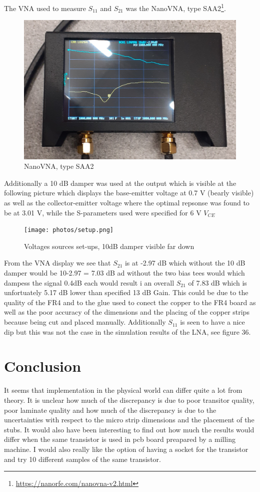 \documentclass{article}
\begin{document}
The VNA used to measure $S_{11}$ and  $S_{21}$ was the NanoVNA, type SAA2\footnote{\url{https://nanorfe.com/nanovna-v2.html}}.
\begin{figure}[H]
\centering
  \includegraphics[scale=0.1]{photos/VNA.png}
  \caption{NanoVNA, type SAA2}
  \label{fig4}
\end{figure}
Additionally a 10 dB damper was used at the output which is visible at the following picture
which displays the base-emitter voltage at 0.7 V (bearly visible) as well as the collector-emitter
voltage where the optimal repsonse was found to be at 3.01 V, while the S-parameters used
were specified for 6 V $V_{CE}$
\begin{figure}[H]
\centering
  \texttt{[image: photos/setup.png]}
  \caption{Voltages sources set-ups, 10dB damper visible far down}
  \label{fig4}
\end{figure}
From the VNA display we see that $S_{21}$ is at -2.97 dB which without the 10 dB damper would be
10-2.97 = 7.03 dB ad without the two bias tees would which dampess the signal 0.4dB each
would result i an overall $S_{21}$ of 7.83 dB which is unfortuately 5.17 dB lower than specified 13 dB Gain.
This could be due to the quality of the FR4 and to the glue used to conect the copper to the
FR4 board as well as the poor accuracy of the dimensions and the placing of the copper strips because being cut
and placed manually. Additionally $S_{11}$ is seen to have a nice dip but this was not the case
in the simulation results of the LNA, see figure 36. 

\section{Conclusion}
 It seems that implementation in the physical world
 can differ quite a lot from theory. It is unclear how much of the discrepancy is due to
poor transitor quality, poor laminate quality and how much of the discrepancy is due to the uncertainties with respect to the micro strip 
dimensions and the placement of the stubs. It would also have been interesting to find out
how much the results would differ when the same transistor is used in
pcb board preapared by a milling machine. I would also really like the option of having
a socket for the transistor and try 10 different samples of the same transistor.
\end{document}
